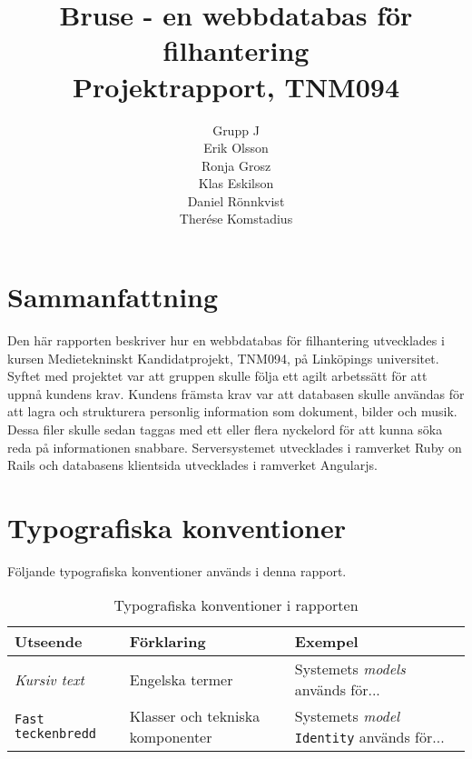 \documentclass[a4paper,12pt,oneside,final]{extbook}
\title{Bruse - en webbdatabas för filhantering\\Projektrapport, TNM094}
\author{Grupp J\\Erik Olsson\\Ronja Grosz\\Klas Eskilson\\Daniel Rönnkvist\\Therése Komstadius}
\begin{document}
\pagestyle{empty}
\thispagestyle{empty}

\frontmatter

\maketitle

\pagestyle{fancy}

\chapter{Sammanfattning}
Den här rapporten beskriver hur en webbdatabas för filhantering utvecklades i kursen Medietekninskt Kandidatprojekt, TNM094, på Linköpings universitet. Syftet med projektet var att gruppen skulle följa ett agilt arbetssätt för att uppnå kundens krav. Kundens främsta krav var att databasen skulle användas för att lagra och strukturera personlig information som dokument, bilder och musik. Dessa filer skulle sedan taggas med ett eller flera nyckelord för att kunna söka reda på informationen snabbare. Serversystemet utvecklades i ramverket Ruby on Rails och databasens klientsida utvecklades i ramverket Angularjs.

\tableofcontents

\cleardoublepage
{}
\listoffigures

\cleardoublepage
{}
\listoftables

\chapter{Typografiska konventioner}
Följande typografiska konventioner används i denna rapport.

\begin{table}[h]
  \begin{centering}
    \begin{tabular}{|l|l|l|}
    \hline
    \textbf{Utseende} & \textbf{Förklaring} & \textbf{Exempel} \\
    \hline
    \emph{Kursiv text} & Engelska termer & Systemets \emph{models} används för... \\
    \hline
    \texttt{Fast teckenbredd} & Klasser och tekniska komponenter & Systemets \emph{model} \texttt{Identity} används för... \\
    \hline
    \end{tabular}
    \caption[Table caption text]{Typografiska konventioner i rapporten}
    \label{table:type}
  \end{centering}
\end{table}
\end{document}
